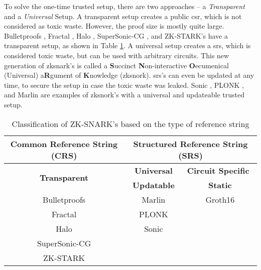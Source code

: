 To solve the one-time trusted setup, there are two approaches -- a \emph{Transparent} and a \emph{Universal} Setup. A transparent setup creates a public \acrshort{csr}, which is not considered as toxic waste. However, the proof size is mostly quite large. Bulletproofs \cite{bunzBulletproofsShortProofs2018}, Fractal \cite{chiesaFractalPostquantumTransparent2020}, Halo \cite{boweRecursiveProofComposition}, SuperSonic-CG \cite{bunzTransparentSNARKsDARK2020}, and ZK-STARK's \cite{ben-sassonScalableTransparentPostquantum} have a transparent setup, as shown in Table \ref{tab:snarks-classification}. A universal setup creates a \acrfull{srs}, which is considered toxic waste, but can be used with arbitrary circuits. This new generation of \acrshort{zksnark}'s is called a \textbf{S}uccinct \textbf{N}on-interactive \textbf{O}ecumenical (Universal) a\textbf{R}gument of \textbf{K}nowledge (\acrshort{zksnork}). \acrshort{srs}'s can even be updated at any time, to secure the setup in case the toxic waste was leaked. Sonic \cite{mallerSonicZeroKnowledgeSNARKs2019}, PLONK \cite{gabizonPlonKPermutationsLagrangebases}, and Marlin \cite{chiesaMarlinPreprocessingZkSNARKs2020} are examples of \acrshort{zksnork}'s with a universal and updateable trusted setup.

\begin{table}[H]
  \small
  \centering
    \begin{tabular}{cccc}
    \toprule
    \textbf{Common Reference String (CRS)} & \multicolumn{3}{c}{\textbf{Structured Reference String (SRS)}} \\
    \midrule
    \multirow{2}[4]{*}{\textbf{Transparent}} & \multicolumn{2}{c}{\textbf{Universal}} & \multicolumn{1}{l}{\textbf{Circuit Specific}} \\
\cmidrule{2-4}          & \multicolumn{2}{c}{\textbf{Updatable}} & \textbf{Static} \\
    \midrule
    Bulletproofs \cite{bunzBulletproofsShortProofs2018} & \multicolumn{2}{c}{Marlin \cite{chiesaMarlinPreprocessingZkSNARKs2020}} & Groth16 \cite{grothSizePairingBasedNoninteractive2016} \\
    Fractal \cite{chiesaFractalPostquantumTransparent2020} & \multicolumn{2}{c}{PLONK \cite{gabizonPlonKPermutationsLagrangebases}} &  \\
    Halo \cite{boweRecursiveProofComposition}  & \multicolumn{2}{c}{Sonic \cite{mallerSonicZeroKnowledgeSNARKs2019}} &  \\
    SuperSonic-CG \cite{bunzTransparentSNARKsDARK2020} &  &  \\
    ZK-STARK \cite{ben-sassonScalableTransparentPostquantum} &       &       &  \\
    \bottomrule
    \end{tabular}%
  \caption{Classification of ZK-SNARK's based on the type of reference string}
  \label{tab:snarks-classification}%
\end{table}%

